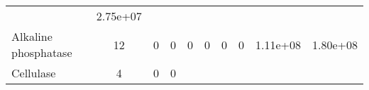 \documentclass[]{article}
\begin{document}
\begin{longtable}[]{@{}lccccccccc@{}}
\begin{minipage}[t]{0.08\columnwidth}
\end{minipage} & \begin{minipage}[t]{0.08\columnwidth}\centering\strut
2.75e+07\strut
\end{minipage}\tabularnewline
\begin{minipage}[t]{0.07\columnwidth}\raggedright\strut
Alkaline phosphatase\strut
\end{minipage} & \begin{minipage}[t]{0.06\columnwidth}\centering\strut
12\strut
\end{minipage} & \begin{minipage}[t]{0.08\columnwidth}\centering\strut
0\strut
\end{minipage} & \begin{minipage}[t]{0.08\columnwidth}\centering\strut
0\strut
\end{minipage} & \begin{minipage}[t]{0.08\columnwidth}\centering\strut
0\strut
\end{minipage} & \begin{minipage}[t]{0.08\columnwidth}\centering\strut
0\strut
\end{minipage} & \begin{minipage}[t]{0.08\columnwidth}\centering\strut
0\strut
\end{minipage} & \begin{minipage}[t]{0.08\columnwidth}\centering\strut
0\strut
\end{minipage} & \begin{minipage}[t]{0.08\columnwidth}\centering\strut
1.11e+08\strut
\end{minipage} & \begin{minipage}[t]{0.08\columnwidth}\centering\strut
1.80e+08\strut
\end{minipage}\tabularnewline
\begin{minipage}[t]{0.07\columnwidth}\raggedright\strut
Cellulase\strut
\end{minipage} & \begin{minipage}[t]{0.06\columnwidth}\centering\strut
4\strut
\end{minipage} & \begin{minipage}[t]{0.08\columnwidth}\centering\strut
0\strut
\end{minipage} & \begin{minipage}[t]{0.08\columnwidth}\centering\strut
0\strut
\end{minipage} & \begin{minipage}[t]{0.08\columnwidth}\centering\strut

\end{minipage}
\end{longtable}
\end{document}

